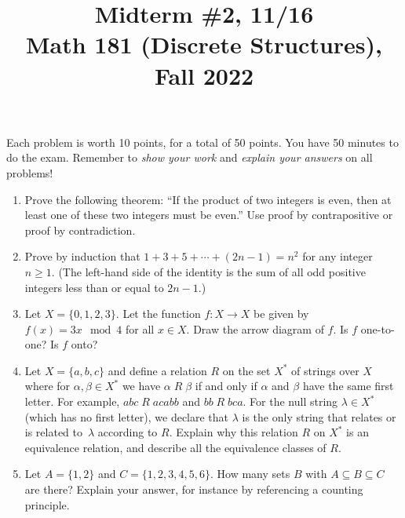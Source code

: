 \documentclass[11pt]{article}
\title{Midterm \#2, 11/16 \\Math 181 (Discrete Structures), Fall 2022}
\date{}
\begin{document}
\maketitle

\thispagestyle{empty}

\vspace{-1cm}

Each problem is worth 10 points, for a total of 50 points. You have 50 minutes to do the exam. Remember to \emph{show your work} and \emph{explain your answers} on all problems!

\begin{enumerate}

\item Prove the following theorem: ``If the product of two integers is even, then at least one of these two integers must be even.'' Use proof by contrapositive or proof by contradiction.

\item Prove by induction that $1+3+5 + \cdots + (2n-1) = n^2$ for any integer $n\geq 1$. (The left-hand side of the identity is the sum of all odd positive integers less than or equal to $2n-1$.)

\item Let $X = \{0,1,2,3\}$. Let the function $f\colon X \to X$ be given by $f(x) = 3x \mod 4$ for all $x \in X$. Draw the arrow diagram of $f$. Is $f$ one-to-one? Is $f$ onto?

\item Let $X = \{a,b,c\}$ and define a relation $R$ on the set $X^*$ of strings over $X$ where for $\alpha, \beta \in X^*$ we have $\alpha \; R \; \beta$ if and only if $\alpha$ and $\beta$ have the same first letter. For example, $abc \; R \; acabb$ and $bb \; R \; bca$. For the null string $\lambda \in X^*$ (which has no first letter), we declare that $\lambda$ is the only string that relates or is related to~$\lambda$ according to $R$. Explain why this relation $R$ on $X^*$ is an equivalence relation, and describe all the equivalence classes of $R$.

\item Let $A = \{1,2\}$ and $C = \{1,2,3,4,5,6\}$. How many sets $B$ with $A \subseteq B \subseteq C$ are there? Explain your answer, for instance by referencing a counting principle.


\end{enumerate}
\end{document}
